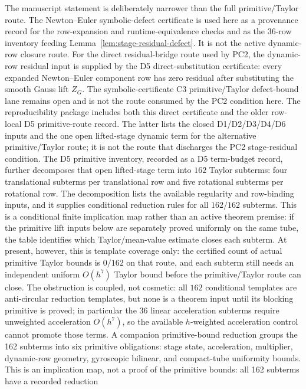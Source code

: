 \documentclass[preprint,12pt]{elsarticle}
\begin{document}
The manuscript statement is deliberately narrower than the full
primitive/Taylor route. The
Newton--Euler symbolic-defect certificate is used here as a provenance
record for the row-expansion and runtime-equivalence checks and as
the 36-row inventory feeding Lemma~\ref{lem:stage-residual-defect}. It is not
the active dynamic-row closure route.  For the direct residual-bridge route
used by PC2,
the dynamic-row residual input is supplied by the D5 direct-substitution
certificate: every expanded Newton--Euler component row has zero residual
after substituting the smooth Gauss lift \(Z_G\). The symbolic-certificate C3
primitive/Taylor defect-bound lane remains open and is not the route consumed
by the PC2 condition here. The reproducibility package includes both this direct
certificate and the older row-local D5 primitive-route record.  The latter lists
the closed D1/D2/D3/D4/D6 inputs and the one open lifted-stage dynamic term
for the alternative primitive/Taylor route; it is not the route that discharges
the PC2 stage-residual condition.
The D5 primitive inventory, recorded as a D5 term-budget record, further
decomposes that open lifted-stage term into \(162\) Taylor subterms: four
translational subterms per translational row and five rotational subterms per
rotational row.  The decomposition lists the available regularity and
row-binding inputs, and it supplies conditional reduction rules for all
\(162/162\) subterms.  This is a conditional finite implication map rather than
an active theorem premise: if the primitive lift inputs below are separately
proved uniformly on the same tube, the table identifies which
Taylor/mean-value estimate closes each subterm.  At present, however, this is
template coverage only: the certified count of actual primitive Taylor bounds is \(0/162\)
on that route, and each subterm still needs an independent uniform \(O(h^7)\)
Taylor bound before the primitive/Taylor route can close.
The obstruction is coupled, not cosmetic: all \(162\) conditional templates
are anti-circular reduction templates, but none is a theorem input until its
blocking primitive is proved; in particular the \(36\) linear acceleration
subterms require unweighted acceleration \(O(h^7)\), so the available
\(h\)-weighted acceleration control cannot promote those terms.
A companion primitive-bound reduction groups the 162 subterms into six primitive obligations:
stage state, acceleration, multiplier, dynamic-row geometry, gyroscopic
bilinear, and compact-tube uniformity bounds.  This is an implication map,
not a proof of the primitive bounds: all 162 subterms have a recorded reduction
\end{document}
